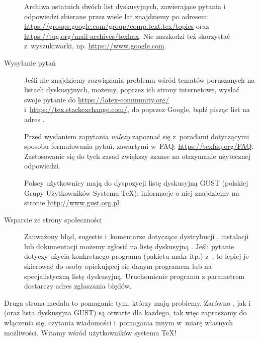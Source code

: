 \documentclass{article}
\begin{document}
\begin{description}

Archiwa ostatnich dwóch list dyskusyjnych,
zawierające  pytania i odpowiedzi zbierane przez wiele lat znajdziemy po adresem:
\url{https://groups.google.com/group/comp.text.tex/topics} oraz
\url{https://tug.org/mail-archives/texhax}. Nie zaszkodzi też
skorzystać z~wyszukiwarki, np. \url{https://www.google.com}.

\item [Wysyłanie pytań] Jeśli   nie znajdziemy rozwiązania problemu wśród tematów poruszanych na listach dyskusyjnych,
możemy, poprzez ich strony internetowe, wysłać swoje pytanie do \url{https://latex-community.org/}  i~\url{https://tex.stackexchange.com/},
do  poprzez Google,
  bądź pisząc list na adres .

Przed wysłaniem zapytania \emph{należy} zapoznać się z~poradami dotyczącymi sposobu
formułowania pytań, zawartymi w~FAQ:
\url{https://texfaq.org/FAQ}. Zastosowanie się do tych zasad zwiększy szanse na otrzymanie użytecznej odpowiedzi.

Polscy użytkownicy mają do dyspozycji listę dyskusyjną GUST (polskiej Grupy
Użytkowników Systemu \TeX); informacje o niej
znajdziemy na stronie \url{http://www.gust.org.pl}.

\item [Wsparcie ze strony społeczności \TL{}] Zauważony błąd, sugestie i~komentarze dotyczące dystrybucji \TL{}, instalacji
lub dokumentacji możemy zgłosić na listę dyskusyjną . Jeśli pytanie dotyczy użycia konkretnego programu
(pakietu makr itp.) z~\TL{}, to lepiej je  skierować   do osoby
opiekującej się danym programem lub na specjalistyczną listę dyskusyjną. Uruchomienie programu z parametrem   dostarczy adres  zgłaszania błędów.
\end{description}

Druga strona medalu to pomaganie tym, którzy mają problemy. Zarówno
, jak i~ (oraz lista dyskusyjna GUST)
są otwarte dla każdego,
tak więc zapraszamy do włączenia się, czytania wiadomości i~pomagania
innym w~miarę własnych możliwości. Witamy wśród użytkowników
systemu \TeX!
\end{document}
